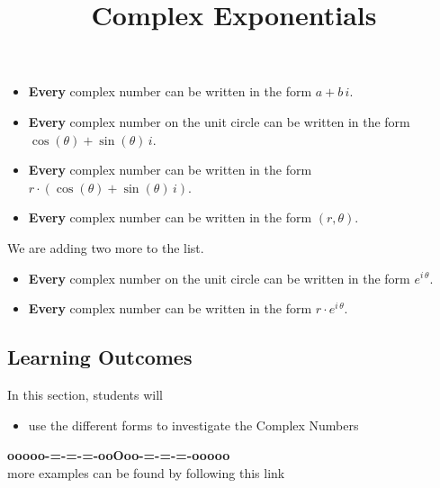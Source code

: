 \documentclass{ximera}
\title{Complex Exponentials}
\begin{document}
\begin{abstract}
%
\end{abstract}
\maketitle



\begin{itemize}
\item \textbf{\textcolor{purple!85!blue}{Every}} complex number can be written in the form $a + b \, i$.
\item \textbf{\textcolor{purple!85!blue}{Every}} complex number on the unit circle can be written in the form $\cos(\theta) + \sin(\theta) \, i$.
\item \textbf{\textcolor{purple!85!blue}{Every}} complex number can be written in the form $r \cdot (\cos(\theta) + \sin(\theta) \, i)$.
\item \textbf{\textcolor{purple!85!blue}{Every}} complex number can be written in the form $(r, \theta)$.
\end{itemize}

We are adding two more to the list.



\begin{itemize}
\item \textbf{\textcolor{purple!85!blue}{Every}} complex number on the unit circle can be written in the form $e^{i \, \theta}$.
\item \textbf{\textcolor{purple!85!blue}{Every}} complex number can be written in the form $r \cdot e^{i \, \theta}$.
\end{itemize}






\subsection*{Learning Outcomes}

\begin{sectionOutcomes}
In this section, students will 

\begin{itemize}
\item use the different forms to investigate the Complex Numbers
\end{itemize}
\end{sectionOutcomes}










\begin{center}
\textbf{\textcolor{green!50!black}{ooooo-=-=-=-ooOoo-=-=-=-ooooo}} \\

more examples can be found by following this link\\ 

\end{center}
\end{document}
